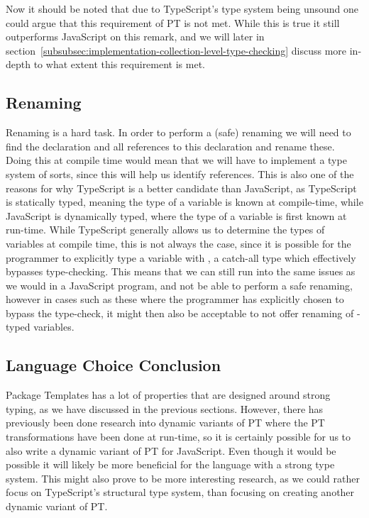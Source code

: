 Now it should be noted that due to TypeScript's type system being unsound one could argue that this requirement of PT is not met.
While this is true it still outperforms JavaScript on this remark, and we will later in section~\vref{subsubsec:implementation-collection-level-type-checking} discuss more in-depth to what extent this requirement is met.

\subsection{Renaming}\label{subsec:ts-vs-js-renaming}

Renaming is a hard task.
In order to perform a (safe) renaming we will need to find the declaration and all references to this declaration and rename these.
Doing this at compile time would mean that we will have to implement a type system of sorts, since this will help us identify references.
This is also one of the reasons for why TypeScript is a better candidate than JavaScript, as TypeScript is statically typed, meaning the type of a variable is known at compile-time, while JavaScript is dynamically typed, where the type of a variable is first known at run-time.
While TypeScript generally allows us to determine the types of variables at compile time, this is not always the case, since it is possible for the programmer to explicitly type a variable with , a catch-all type which effectively bypasses type-checking.
This means that we can still run into the same issues as we would in a JavaScript program, and not be able to perform a safe renaming, however in cases such as these where the programmer has explicitly chosen to bypass the type-check, it might then also be acceptable to not offer renaming of -typed variables.

\subsection{Language Choice Conclusion}\label{subsec:langauge-choice-conclusion}

Package Templates has a lot of properties that are designed around strong typing, as we have discussed in the previous sections.
However, there has previously been done research into dynamic variants of PT where the PT transformations have been done at run-time, so it is certainly possible for us to also write a dynamic variant of PT for JavaScript.
Even though it would be possible it will likely be more beneficial for the language with a strong type system.
This might also prove to be more interesting research, as we could rather focus on TypeScript's structural type system, than focusing on creating another dynamic variant of PT.

